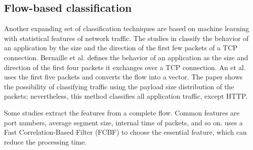 \documentclass[preprint,12pt]{elsarticle}
\begin{document}


\subsection{Flow-based classification}
\label{sec:flow}
Another expanding set of classification techniques are based on machine learning with statistical features of network traffic. The studies in \cite{EAI06, ATC13} classify the behavior of an application by the size and the direction of the first few packets of a TCP connection. Bernaille et al. \cite{EAI06} defines the behavior of an application as the size and direction of the first four packets it exchanges over a TCP connection. An et al. \cite{ATC13} uses the first five packets and converts the flow into a vector. The paper shows the possibility of classifying traffic using the payload size distribution of the packets; nevertheless, this method classifies all application traffic, except HTTP.

Some studies \cite{AIS14, CMF04, COC12} extract the features from a complete flow. Common features are port numbers, average segment size, internal time of packets, and so on. \cite{AIS14} uses a Fast Correlation-Based Filter (FCBF) to choose the essential feature, which can reduce the processing time. 
\end{document}
